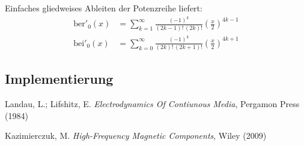 \documentclass[10pt,a4paper]{article}
\begin{document}
Einfaches gliedweises Ableiten der Potenzreihe liefert:
\begin{align}
	\mathrm{ber}'_0(x) &= \sum^{\infty}_{k=1} \frac{\left( -1 \right)^k}{\left( 2k-1 \right)! \, \left( 2k \right)!} \left( \frac{x}{2} \right)^{4k-1}\\
	\mathrm{bei}'_0(x) &= \sum^{\infty}_{k=0} \frac{\left( -1 \right)^k}{\left( 2k \right)! \, \left( 2k+1 \right)!} \left( \frac{x}{2} \right)^{4k+1}
\end{align}

\subsection{Implementierung}


\begin{thebibliography}{9}

Landau, L.; Lifshitz, E.
\emph{Electrodynamics Of Contiunous Media},
Pergamon Press (1984)

Kazimierczuk, M.
\emph{High-Frequency Magnetic Components},
Wiley (2009)

\end{thebibliography}
\end{document}
